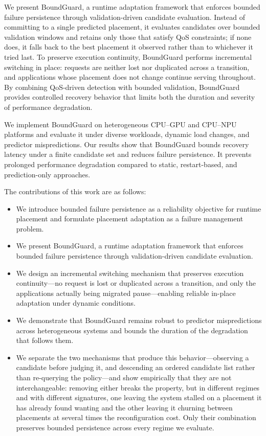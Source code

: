 \documentclass[conference]{IEEEtran}
\begin{document}
We present BoundGuard, a runtime adaptation framework that enforces bounded failure persistence through validation-driven candidate evaluation. 
Instead of committing to a single predicted placement, it evaluates candidates over bounded validation windows and retains only those that satisfy QoS constraints\textcolor{navyblue}{; if none does, it falls back to the best placement it observed rather than to whichever it tried last.}
%
\textcolor{navyblue}{To preserve execution continuity, BoundGuard performs incremental switching in place: requests are neither lost nor duplicated across a transition, and applications whose placement does not change continue serving throughout.}
By combining QoS-driven detection with bounded validation, BoundGuard provides controlled recovery behavior that limits both the duration and severity of performance degradation.

We implement BoundGuard on heterogeneous CPU--GPU and CPU--NPU platforms and evaluate it under diverse workloads, dynamic load changes, and predictor mispredictions.
Our results show that BoundGuard bounds recovery latency under a finite candidate set and reduces failure persistence. It prevents prolonged performance degradation compared to static, restart-based, and prediction-only approaches.

The contributions of this work are as follows:

\begin{itemize}[leftmargin=10pt]
\item We introduce bounded failure persistence as a reliability objective for runtime placement and formulate placement adaptation as a failure management problem.
\item We present BoundGuard, a runtime adaptation framework that enforces bounded failure persistence through validation-driven candidate evaluation.
\item \textcolor{navyblue}{We design an incremental switching mechanism that preserves execution continuity---no request is lost or duplicated across a transition, and only the applications actually being migrated pause---enabling reliable in-place adaptation under dynamic conditions.}
\item We demonstrate that BoundGuard remains robust to predictor mispredictions across heterogeneous systems \textcolor{navyblue}{and bounds the duration of the degradation that follows them.}
\item \textcolor{navyblue}{We separate the two mechanisms that produce this behavior---observing a candidate before judging it, and descending an ordered candidate list rather than re-querying the policy---and show empirically that they are not interchangeable: removing either breaks the property, but in different regimes and with different signatures, one leaving the system stalled on a placement it has already found wanting and the other leaving it churning between placements at several times the reconfiguration cost. Only their combination preserves bounded persistence across every regime we evaluate.}
\end{itemize}
\end{document}
